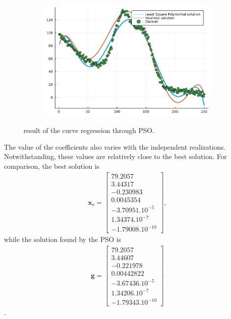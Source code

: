\documentclass[12pt,a4paper]{article}
\begin{document}
\begin{figure}[H]\ContinuedFloat
    \centering
    \begin{subfigure}{0.6\textwidth}
        \includegraphics[width=\linewidth]{../figs/methaeuristic_regression_result3.png}
    \end{subfigure}
    \caption{result of the curve regression through PSO.}
    \label{fig:heuristic-regression}
\end{figure}

The value of the coefficients also varies with the independent realizations. Notwithstanding, these values are relatively close to the best solution. For comparison, the best solution is
\begin{align}
    \mathbf{x}_o = \begin{bmatrix}
        79.2057 \\ 3.44317 \\ -0.230983 \\ 0.0045354 \\ -3.70951.10^{-5} \\ 1.34374.10^{-7} \\ -1.79008.10^{-10}
    \end{bmatrix},
\end{align}
while the solution found by the PSO is
\begin{align}
    \mathbf{g} = \begin{bmatrix}
        79.2057 \\ 3.44607 \\ -0.221978 \\ 0.00442822 \\ -3.67436.10^{-5} \\ 1.34206.10^{-7} \\ -1.79343.10^{-10}
    \end{bmatrix}
\end{align}.
\end{document}
